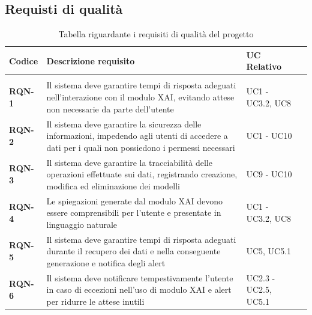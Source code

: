 \newpage

\subsection{Requisti di qualità}
\keepXColumns
{}
    \begin{longtable}{|l|p{}|p{}|l|}
        \hline
        \rowcolor{gold}
        \textbf{Codice} & \textbf{Descrizione requisito} & \textbf{UC Relativo}\\
        \hline
        \endhead

        \hline
        \rowcolor{white}
        \caption{Tabella riguardante i requisiti di qualità del progetto} \label{tab:requisiti_qualitativi} \\
        \endlastfoot 

        \textbf{RQN-1} & Il sistema deve garantire tempi di risposta adeguati nell'interazione con il modulo XAI, evitando attese non necessarie da parte dell'utente & UC1 - UC3.2, UC8\\
        \hline
        \textbf{RQN-2} & Il sistema deve garantire la sicurezza delle informazioni, impedendo agli utenti di accedere a dati per i quali non possiedono i permessi necessari & UC1 - UC10 \\
        \hline
        \textbf{RQN-3} & Il sistema deve garantire la tracciabilità delle operazioni effettuate sui dati, registrando creazione, modifica ed eliminazione dei modelli & UC9 - UC10  \\
        \hline
        \textbf{RQN-4} & Le spiegazioni generate dal modulo XAI devono essere comprensibili per l'utente e presentate in linguaggio naturale & UC1 - UC3.2, UC8 \\
        \hline
        \textbf{RQN-5} & Il sistema deve garantire tempi di risposta adeguati durante il recupero dei dati e nella conseguente generazione e notifica degli alert & UC5, UC5.1 \\
        \hline
        \textbf{RQN-6} & Il sistema deve notificare tempestivamente l'utente in caso di eccezioni nell'uso di modulo XAI e alert per ridurre le attese inutili & UC2.3 - UC2.5, UC5.1 \\
    \end{longtable}


